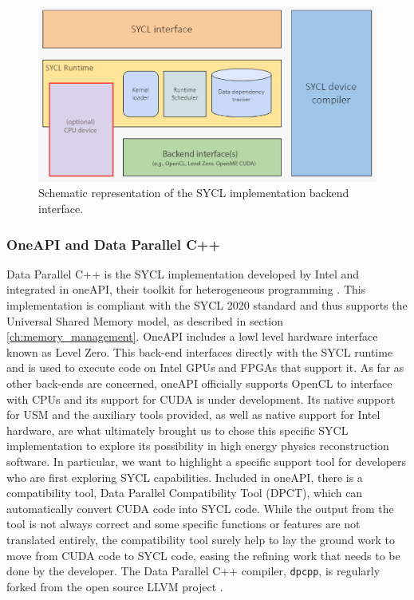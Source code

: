 \begin{figure}[H]
    \centering
    \includegraphics[width=\textwidth]{media/ex_sycl_implementation.png}
    \caption{Schematic representation of the SYCL implementation backend interface.}
    \label{fig:sycl_implementations_backend}
\end{figure}

\subsubsection{OneAPI and Data Parallel C++}
Data Parallel C++ is the SYCL implementation developed by Intel and integrated in oneAPI, their toolkit for heterogeneous programming \cite{oneAPI}. This implementation is compliant with the SYCL 2020 standard and thus supports the Universal Shared Memory model, as described in section \ref{ch:memory_management}. OneAPI includes a lowl level hardware interface known as Level Zero. This back-end interfaces directly with the SYCL runtime and is used to execute code on Intel GPUs and FPGAs that support it. As far as other back-ends are concerned, oneAPI officially supports OpenCL to interface with CPUs and its support for CUDA is under development. Its native support for USM and the auxiliary tools provided, as well as native support for Intel hardware, are what ultimately brought us to chose this specific SYCL implementation to explore its possibility in high energy physics reconstruction software. In particular, we want to highlight a specific support tool for developers who are first exploring SYCL capabilities. Included in oneAPI, there is a compatibility tool, Data Parallel Compatibility Tool (DPCT), which can automatically convert CUDA code into SYCL code. While the output from the tool is not always correct and some specific functions or features are not translated entirely, the compatibility tool surely help to lay the ground work to move from CUDA code to SYCL code, easing the refining work that needs to be done by the developer.
The Data Parallel C++ compiler, \Verb "dpcpp", is regularly forked from the open source LLVM project \cite{dpcpp}.

